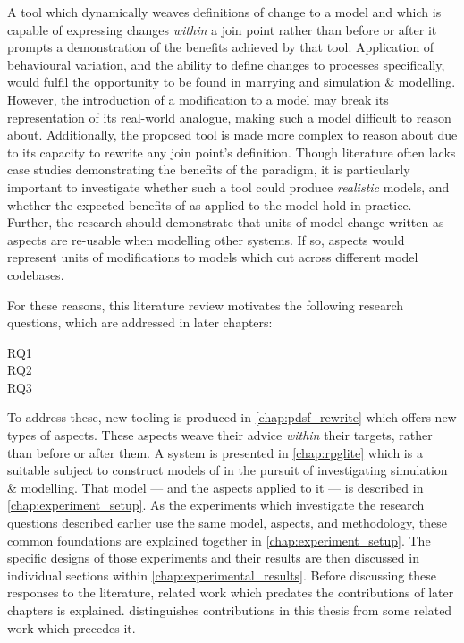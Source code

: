 A tool which dynamically weaves definitions of change to a model and which is
capable of expressing changes \emph{within} a join point rather than before or
after it prompts a demonstration of the benefits achieved by that tool.
Application of behavioural variation, and the ability to define changes to
processes specifically, would fulfil the opportunity to be found in marrying
\aspectorientation{} and simulation \& modelling. However, the introduction of a
modification to a model may break its representation of its real-world analogue,
making such a model difficult to reason about. Additionally, the proposed tool
is made more complex to reason about due to its capacity to rewrite any join
point's definition. Though \aop{} literature often lacks case studies
demonstrating the benefits of the paradigm, it is particularly important to
investigate whether such a tool could produce \emph{realistic} models, and
whether the expected benefits of \aspectorientation{} as applied to the model
hold in practice. Further, the research should demonstrate that units of model
change written as aspects are re-usable when modelling other systems. If so,
aspects would represent units of modifications to models which cut across
different model codebases.

For these reasons, this literature review motivates the following research
questions, which are addressed in later chapters:

\begin{researchquestion}
\begin{description}
  \item[RQ1] \rqtwo{}
  \item[RQ2] \rqthree{}
  \item[RQ3] \rqfour{}
\end{description}
\end{researchquestion}

To address these, new tooling is produced in \cref{chap:pdsf_rewrite} which
offers new types of aspects. These aspects weave their advice \emph{within}
their targets, rather than before or after them. A system is presented in
\cref{chap:rpglite} which is a suitable subject to construct models of in the
pursuit of investigating \aspectoriented{} simulation \& modelling. That model
--- and the aspects applied to it --- is described in
\cref{chap:experiment_setup}. As the experiments which investigate the research
questions described earlier use the same model, aspects, and methodology, these
common foundations are explained together in \cref{chap:experiment_setup}. The
specific designs of those experiments and their results are then discussed in
individual sections within \cref{chap:experimental_results}. Before discussing
these responses to the literature, related work which predates the contributions
of later chapters is explained.  distinguishes
contributions in this thesis from some related work which precedes it.
